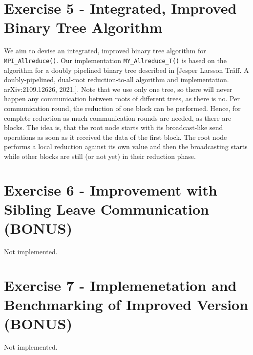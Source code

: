 \section{Exercise 5 - Integrated, Improved Binary Tree Algorithm}
We aim to devise an integrated, improved binary tree algorithm for \texttt{MPI\_Allreduce()}. Our 
implementation \texttt{MY\_Allreduce\_T()} is based on the algorithm for a doubly pipelined binary 
tree described in [Jesper Larsson Träff. A doubly-pipelined, dual-root reduction-to-all algorithm and 
implementation. arXiv:2109.12626, 2021.]. Note that we use only one tree, so there will never happen any 
communication between roots of different trees, as there is no. Per communication round, the reduction of 
one block can be performed. Hence, for complete reduction as much communication rounds are needed, 
as there are blocks. The idea is, that the root node starts with its broadcast-like send operations 
as soon as it received the data of the first block. The root node performs a local reduction against 
its own value and then the broadcasting starts while other blocks are still (or not yet) 
in their reduction phase. \\


\pagebreak
\section{Exercise 6 - Improvement with Sibling Leave Communication (BONUS)}
Not implemented.

\section{Exercise 7 - Implemenetation and Benchmarking of Improved Version (BONUS)}
Not implemented.
\pagebreak